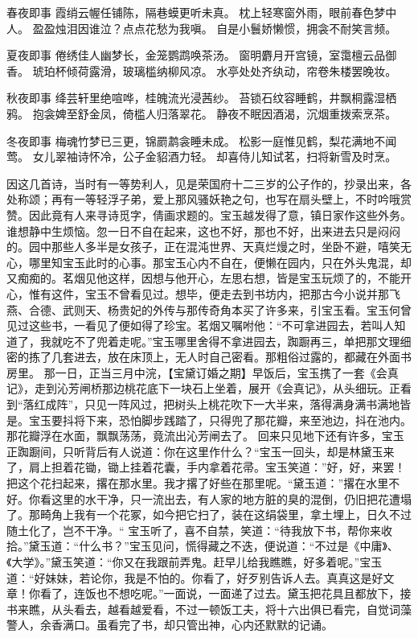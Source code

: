 \documentclass[12pt,oneside]{book}
\begin{document}
春夜即事
霞绡云幄任铺陈，隔巷蟆更听未真。
枕上轻寒窗外雨，眼前春色梦中人。
盈盈烛泪因谁泣？点点花愁为我嗔。
自是小鬟娇懒惯，拥衾不耐笑言频。

夏夜即事
倦绣佳人幽梦长，金笼鹦鹉唤茶汤。
窗明麝月开宫镜，室霭檀云品御香。
琥珀杯倾荷露滑，玻璃槛纳柳风凉。
水亭处处齐纨动，帘卷朱楼罢晚妆。

秋夜即事
绛芸轩里绝喧哗，桂魄流光浸茜纱。
苔锁石纹容睡鹤，井飘桐露湿栖鸦。
抱衾婢至舒金凤，倚槛人归落翠花。
静夜不眠因酒渴，沉烟重拨索烹茶。

冬夜即事
梅魂竹梦已三更，锦罽鹔衾睡未成。
松影一庭惟见鹤，梨花满地不闻莺。
女儿翠袖诗怀冷，公子金貂酒力轻。
却喜侍儿知试茗，扫将新雪及时烹。

因这几首诗，当时有一等势利人，见是荣国府十二三岁的公子作的，抄录出来，各处称颂；再有一等轻浮子弟，爱上那风骚妖艳之句，也写在扇头壁上，不时吟哦赏赞。因此竟有人来寻诗觅字，倩画求题的。宝玉越发得了意，镇日家作这些外务。
谁想静中生烦恼。忽一日不自在起来，这也不好，那也不好，出来进去只是闷闷的。园中那些人多半是女孩子，正在混沌世界、天真烂熳之时，坐卧不避，嘻笑无心，哪里知宝玉此时的心事。那宝玉心内不自在，便懒在园内，只在外头鬼混，却又痴痴的。茗烟见他这样，因想与他开心，左思右想，皆是宝玉玩烦了的，不能开心，惟有这件，宝玉不曾看见过。想毕，便走去到书坊内，把那古今小说并那飞燕、合德、武则天、杨贵妃的外传与那传奇角本买了许多来，引宝玉看。宝玉何曾见过这些书，一看见了便如得了珍宝。茗烟又嘱咐他：“不可拿进园去，若叫人知道了，我就吃不了兜着走呢。”宝玉哪里舍得不拿进园去，踟蹰再三，单把那文理细密的拣了几套进去，放在床顶上，无人时自己密看。那粗俗过露的，都藏在外面书房里。
那一日，正当三月中浣，【宝黛订婚之期】早饭后，宝玉携了一套《会真记》，走到沁芳闸桥那边桃花底下一块石上坐着，展开《会真记》，从头细玩。正看到“落红成阵”，只见一阵风过，把树头上桃花吹下一大半来，落得满身满书满地皆是。宝玉要抖将下来，恐怕脚步践踏了，只得兜了那花瓣，来至池边，抖在池内。那花瓣浮在水面，飘飘荡荡，竟流出沁芳闸去了。
回来只见地下还有许多，宝玉正踟蹰间，只听背后有人说道：你在这里作什么？“宝玉一回头，却是林黛玉来了，肩上担着花锄，锄上挂着花囊，手内拿着花帚。宝玉笑道：”好，好，来罢！把这个花扫起来，撂在那水里。我才撂了好些在那里呢。“黛玉道：”撂在水里不好。你看这里的水干净，只一流出去，有人家的地方脏的臭的混倒，仍旧把花遭塌了。那畸角上我有一个花冢，如今把它扫了，装在这绢袋里，拿土埋上，日久不过随土化了，岂不干净。“
宝玉听了，喜不自禁，笑道：“待我放下书，帮你来收拾。”黛玉道：“什么书？”宝玉见问，慌得藏之不迭，便说道：“不过是《中庸》、《大学》。”黛玉笑道：“你又在我跟前弄鬼。赶早儿给我瞧瞧，好多着呢。”宝玉道：“好妹妹，若论你，我是不怕的。你看了，好歹别告诉人去。真真这是好文章！你看了，连饭也不想吃呢。”一面说，一面递了过去。黛玉把花具且都放下，接书来瞧，从头看去，越看越爱看，不过一顿饭工夫，将十六出俱已看完，自觉词藻警人，余香满口。虽看完了书，却只管出神，心内还默默的记诵。
\end{document}
